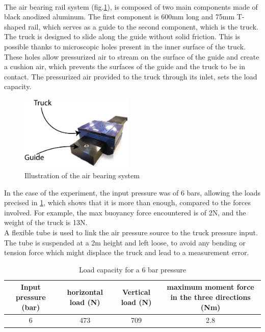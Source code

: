 \paragraph{}
The air bearing rail system (fig.\ref{fig:pic_frictionless}), is composed of two main components made of black anodized aluminum. The first component is 600mm long and 75mm T-shaped rail, which serves as a guide to the second component, which is the truck. The truck is designed to slide along the guide without solid friction. This is possible thanks to microscopic holes present in the inner surface of the truck. These holes allow pressurized air to stream on the surface of the guide and create a cushion air, which prevents the surfaces of the guide and the truck to be in contact. The pressurized air provided to the truck through its inlet, sets the load capacity.
\begin{figure}[H] %
	\centering%
	\includegraphics[width=0.48\textwidth]{figures/Chapter_1/Airbearing.png}
	\caption{Illustration of the air bearing system}
	\label{fig:pic_frictionless}
\end{figure}
In the case of the experiment, the input pressure was of 6 bars, allowing the loads precised in \ref{tab:pressure_truck}, which shows that it is more than enough, compared to the forces involved. For example, the max buoyancy force encountered is of 2N, and the weight of the truck is 13N.\\
A flexible tube is used to link the air pressure source to the truck pressure input. The tube is suspended at a 2m height and left loose, to avoid any bending or tension force which might displace the truck and lead to a measurement error.
\begin{table}[H]
	\centering
		\begin{adjustbox}{width=\textwidth}
			\begin{tabular}{|c|c|c|c|}
				\hline
				Input pressure (bar) & horizontal load (N)&Vertical load (N)& maximum moment force in the three directions (Nm) \\
				\hline
				6&473&709&2.8\\
				\hline
			\end{tabular}
		\end{adjustbox}
	\caption{Load capacity for a 6 bar pressure}
	\label{tab:pressure_truck}
\end{table}
